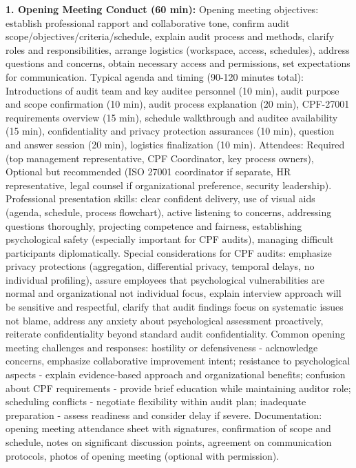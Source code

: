 \documentclass[11pt,a4paper]{article}
\begin{document}
\textbf{1. Opening Meeting Conduct (60 min):} Opening meeting objectives: establish professional rapport and collaborative tone, confirm audit scope/objectives/criteria/schedule, explain audit process and methods, clarify roles and responsibilities, arrange logistics (workspace, access, schedules), address questions and concerns, obtain necessary access and permissions, set expectations for communication. Typical agenda and timing (90-120 minutes total): Introductions of audit team and key auditee personnel (10 min), audit purpose and scope confirmation (10 min), audit process explanation (20 min), CPF-27001 requirements overview (15 min), schedule walkthrough and auditee availability (15 min), confidentiality and privacy protection assurances (10 min), question and answer session (20 min), logistics finalization (10 min). Attendees: Required (top management representative, CPF Coordinator, key process owners), Optional but recommended (ISO 27001 coordinator if separate, HR representative, legal counsel if organizational preference, security leadership). Professional presentation skills: clear confident delivery, use of visual aids (agenda, schedule, process flowchart), active listening to concerns, addressing questions thoroughly, projecting competence and fairness, establishing psychological safety (especially important for CPF audits), managing difficult participants diplomatically. Special considerations for CPF audits: emphasize privacy protections (aggregation, differential privacy, temporal delays, no individual profiling), assure employees that psychological vulnerabilities are normal and organizational not individual focus, explain interview approach will be sensitive and respectful, clarify that audit findings focus on systematic issues not blame, address any anxiety about psychological assessment proactively, reiterate confidentiality beyond standard audit confidentiality. Common opening meeting challenges and responses: hostility or defensiveness - acknowledge concerns, emphasize collaborative improvement intent; resistance to psychological aspects - explain evidence-based approach and organizational benefits; confusion about CPF requirements - provide brief education while maintaining auditor role; scheduling conflicts - negotiate flexibility within audit plan; inadequate preparation - assess readiness and consider delay if severe. Documentation: opening meeting attendance sheet with signatures, confirmation of scope and schedule, notes on significant discussion points, agreement on communication protocols, photos of opening meeting (optional with permission).
\end{document}
